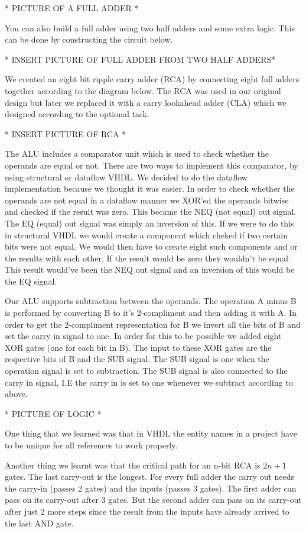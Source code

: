 \documentclass[a4paper,11pt]{article}
\begin{document}
* PICTURE OF A FULL ADDER *

You can also build a full adder using two half adders and some extra logic. This can be done by constructing the circuit below.

* INSERT PICTURE OF FULL ADDER FROM TWO HALF ADDERS*

We created an eight bit ripple carry adder (RCA) by connecting eight full adders together according to the diagram below. The RCA was used in our original design but later we replaced it with a carry lookahead adder (CLA) which we designed according to the optional task. 

* INSERT PICTURE OF RCA *

The ALU includes a comparator unit which is used to check whether the operands are equal or not. There are two ways to implement this comparator, by using structural or dataflow VHDL. We decided to do the dataflow implementation because we thought it was easier. In order to check whether the operands are not equal in a dataflow manner we XOR'ed the operands bitwise and checked if the result was zero. This became the NEQ (not equal) out signal. The EQ (equal) out signal was simply an inversion of this. If we were to do this in structural VHDL we would create a component which cheked if two certain bits were not equal. We would then have to create eight such components and or the results with each other. If the result would be zero they wouldn't be equal. This result would've been the NEQ out signal and an inversion of this would be the EQ signal. 

Our ALU supports subtraction between the operands. The operation A minus B is performed by converting B to it's 2-compliment and then adding it with A. In order to get the 2-compliment representation for B we invert all the bits of B and set the carry in signal to one. In order for this to be possible we added eight XOR gates (one for each bit in B). The input to these XOR gates are the respective bits of B and the SUB signal. The SUB signal is one when the operation signal is set to subtraction. The SUB signal is also connected to the carry in signal, I.E the carry in is set to one whenever we subtract according to above.

* PICTURE OF LOGIC *

One thing that we learned was that in VHDL the entity names in a project have to be unique for all references to work properly. 

Another thing we learnt was that the critical path for an n-bit RCA is $2n+1$ gates. The last carry-out is the longest. For every full adder the carry out needs the carry-in (passes 2 gates) and the inputs (passes 3 gates). The first adder can pass on its carry-out after 3 gates. But the second adder can pass on its carry-out after just 2 more steps since the result from the inputs have already arrived to the last AND gate.
\end{document}

